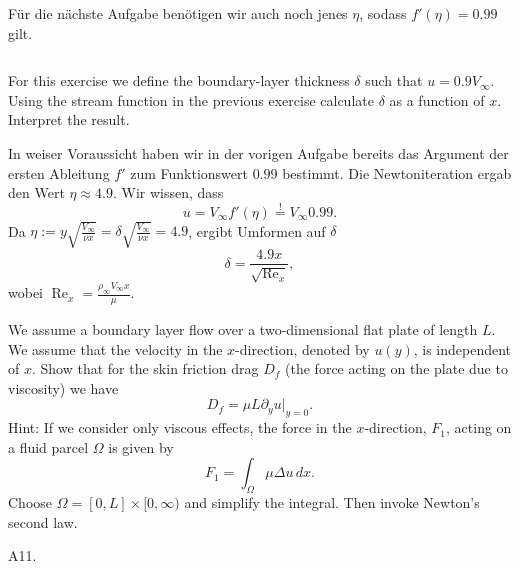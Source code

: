 \documentclass[12pt]{exam}
\newcommand{\del}{\partial}
\begin{document}
\begin{questions}
\begin{solution}
    Für die nächste Aufgabe benötigen wir auch noch jenes $\eta$, sodass $f'(\eta) = 0.99$ gilt.
    \inputminted[breaklines, fontsize=\small, firstline=29, lastline=33]{python}{blasius_equation.py}
    \end{solution}
    
    
    \question For this exercise we define the boundary-layer thickness $\delta$ such that $u = 0.9 V_{\infty}$. Using the stream function in the previous exercise calculate $\delta$ as a function of $x$. Interpret the result.
    
    \begin{solution}
        In weiser Voraussicht haben wir in der vorigen Aufgabe bereits das Argument der ersten Ableitung $f'$ zum Funktionswert $0.99$ bestimmt. Die Newtoniteration ergab den Wert $\eta \approx 4.9$. Wir wissen, dass 
        \begin{equation*}
            u = V_{\infty} f'(\eta) \overset{!}{=} V_{\infty} 0.99.
        \end{equation*}
        Da $\eta := y \sqrt{\frac{V_{\infty}}{\nu x}} = \delta \sqrt{\frac{V_{\infty}}{\nu x}} = 4.9$, ergibt Umformen auf $\delta$
        \begin{equation*}
            \delta = \frac{4.9x}{\sqrt{\operatorname{Re}_x}},
        \end{equation*}
        wobei $\operatorname{Re}_x = \frac{\rho_{\infty} V_{\infty} x}{\mu}$.
    \end{solution}
    
    
    \question We assume a boundary layer flow over a two-dimensional flat plate of length $L$. We assume that the velocity in the $x$-direction, denoted by $u(y)$, is independent of $x$. Show that for the skin friction drag $D_f$ (the force acting on the plate due to viscosity) we have
    \begin{equation*}
        D_f = \mu L \del_y u \vert_{y=0}.
    \end{equation*}
    Hint: If we consider only viscous effects, the force in the $x$-direction, $F_1$, acting on a fluid parcel $\Omega$ is given by
    \begin{equation*}
        F_1 = \int_\Omega \mu \Delta u \, dx.
    \end{equation*}
    Choose $\Omega = [0, L] \times [0, \infty)$ and simplify the integral. Then invoke Newton's second law.
    
    \begin{solution}
        A11.
    \end{solution}
    

\end{questions}
\end{document}
